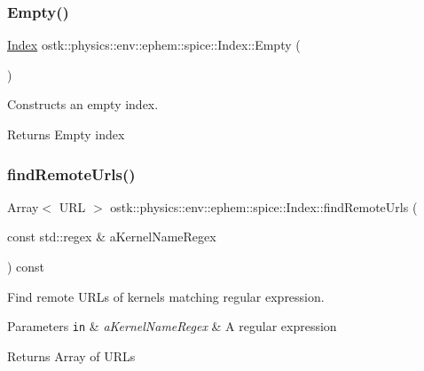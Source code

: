 \subsubsection{\texorpdfstring{Empty()}{Empty()}}
{\footnotesize\ttfamily \hyperlink{classostk_1_1physics_1_1env_1_1ephem_1_1spice_1_1_index}{Index} ostk\+::physics\+::env\+::ephem\+::spice\+::\+Index\+::\+Empty (\begin{DoxyParamCaption}{ }\end{DoxyParamCaption})\hspace{0.3cm}{\ttfamily [static]}}



Constructs an empty index. 

\begin{DoxyReturn}{Returns}
Empty index 
\end{DoxyReturn}
\mbox{\label{classostk_1_1physics_1_1env_1_1ephem_1_1spice_1_1_index_aa2bc4acdf1f1d209cb0fbe0f9a49a3f4}} 
\subsubsection{\texorpdfstring{find\+Remote\+Urls()}{findRemoteUrls()}}
{\footnotesize\ttfamily Array$<$ U\+RL $>$ ostk\+::physics\+::env\+::ephem\+::spice\+::\+Index\+::find\+Remote\+Urls (\begin{DoxyParamCaption}\item[{const std\+::regex \&}]{a\+Kernel\+Name\+Regex }\end{DoxyParamCaption}) const}



Find remote U\+R\+Ls of kernels matching regular expression. 


\begin{DoxyParams}[1]{Parameters}
\mbox{\tt in}  & {\em a\+Kernel\+Name\+Regex} & A regular expression \\
\hline
\end{DoxyParams}
\begin{DoxyReturn}{Returns}
Array of U\+R\+Ls 
\end{DoxyReturn}
\mbox{\label{classostk_1_1physics_1_1env_1_1ephem_1_1spice_1_1_index_a486ec6dad159dfdee2436be60ba5eb20}} 
